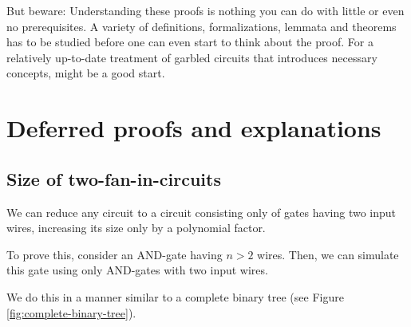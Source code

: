 \message{ !name(seminar.tex)}\documentclass{llncs}
\begin{document}
But beware: Understanding these proofs is nothing you can do with little or even no prerequisites. A variety of definitions, formalizations, lemmata and theorems has to be studied before one can even start to think about the proof. For a relatively up-to-date treatment of garbled circuits that introduces necessary concepts, \cite{bellare-hoang-rogaway-garbling-schemes} might be a good start.


\appendix{}

\section{Deferred proofs and explanations}
\label{sec:deferred-proofs}

\subsection{Size of two-fan-in-circuits}
\label{sec:size-two-fan-circuits}

We can reduce any circuit to a circuit consisting only of gates having two input wires, increasing its size only by a polynomial factor.

To prove this, consider an AND-gate having $n>2$ wires. Then, we can simulate this gate using only AND-gates with two input wires. 

We do this in a manner similar to a complete binary tree (see Figure \ref{fig:complete-binary-tree}). 
\end{document}
